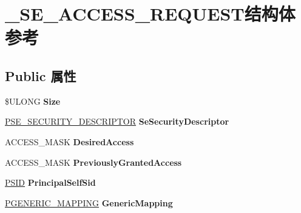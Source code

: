 \hypertarget{struct___s_e___a_c_c_e_s_s___r_e_q_u_e_s_t}{}\section{\+\_\+\+S\+E\+\_\+\+A\+C\+C\+E\+S\+S\+\_\+\+R\+E\+Q\+U\+E\+S\+T结构体 参考}
\label{struct___s_e___a_c_c_e_s_s___r_e_q_u_e_s_t}
\subsection*{Public 属性}
\begin{DoxyCompactItemize}
\item 
\mbox{\label{struct___s_e___a_c_c_e_s_s___r_e_q_u_e_s_t_a7aa6e1edd5017c9f864891a63e63a1a0}} 
\$U\+L\+O\+NG {\bfseries Size}
\item 
\mbox{\label{struct___s_e___a_c_c_e_s_s___r_e_q_u_e_s_t_a662a9a377491d4553a026b1fd48c9107}} 
\hyperlink{struct___s_e___s_e_c_u_r_i_t_y___d_e_s_c_r_i_p_t_o_r}{P\+S\+E\+\_\+\+S\+E\+C\+U\+R\+I\+T\+Y\+\_\+\+D\+E\+S\+C\+R\+I\+P\+T\+OR} {\bfseries Se\+Security\+Descriptor}
\item 
\mbox{\label{struct___s_e___a_c_c_e_s_s___r_e_q_u_e_s_t_a68f98a1d915cbd2d64eb189f9c30326a}} 
A\+C\+C\+E\+S\+S\+\_\+\+M\+A\+SK {\bfseries Desired\+Access}
\item 
\mbox{\label{struct___s_e___a_c_c_e_s_s___r_e_q_u_e_s_t_aa5355874715ee9f0c0b819ba99756ad6}} 
A\+C\+C\+E\+S\+S\+\_\+\+M\+A\+SK {\bfseries Previously\+Granted\+Access}
\item 
\mbox{\label{struct___s_e___a_c_c_e_s_s___r_e_q_u_e_s_t_a1ea5cdbb92f826318e49e014d5a739c9}} 
\hyperlink{struct___s_i_d}{P\+S\+ID} {\bfseries Principal\+Self\+Sid}
\item 
\mbox{\label{struct___s_e___a_c_c_e_s_s___r_e_q_u_e_s_t_a91dd800fa7e49d7f0a9d774c4520fbcc}} 
\hyperlink{struct___g_e_n_e_r_i_c___m_a_p_p_i_n_g}{P\+G\+E\+N\+E\+R\+I\+C\+\_\+\+M\+A\+P\+P\+I\+NG} {\bfseries Generic\+Mapping}

\end{DoxyCompactItemize}
